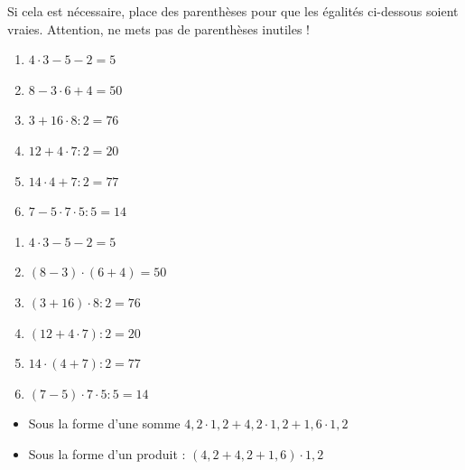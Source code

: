 \documentclass[../../syllabus_1.tex]{subfiles}
\begin{document}
\begin{exercise}
    Si cela est nécessaire, place des parenthèses pour que les égalités ci-dessous soient vraies. Attention, ne mets pas de parenthèses inutiles !
    \begin{enumerate}[cols=3]
        \item \(4 \cdot 3 - 5 - 2 = 5\)
        \item \(8 - 3 \cdot 6 + 4 = 50\)
        \item \(3 + 16 \cdot 8 : 2 = 76\)
        \item \(12 + 4 \cdot 7 : 2 = 20\)
        \item \(14 \cdot 4 + 7 : 2 = 77\)
        \item \(7 - 5 \cdot 7 \cdot 5 : 5 = 14\)
    \end{enumerate}
\end{exercise}
\begin{solution}
    \begin{enumerate}
        \item \(4 \cdot 3 - 5 - 2 = 5\)
        \item \( (8 - 3) \cdot (6 + 4) = 50\)
        \item \( (3 + 16) \cdot 8 : 2 = 76\)
        \item \( (12 + 4 \cdot 7) : 2 = 20\)
        \item \(14 \cdot (4 + 7) : 2 = 77\)
        \item \((7 - 5) \cdot 7 \cdot 5 : 5 = 14\)
    \end{enumerate}
\end{solution}

\begin{solution}
    \begin{itemize}[label=]
        \item  Sous la forme d'une somme $4,2 \cdot 1,2 + 4,2 \cdot 1,2 + 1,6 \cdot 1,2$
        \item Sous la forme d'un produit : $(4,2 + 4,2 + 1,6) \cdot 1,2$
    \end{itemize}

\end{solution}
\end{document}
